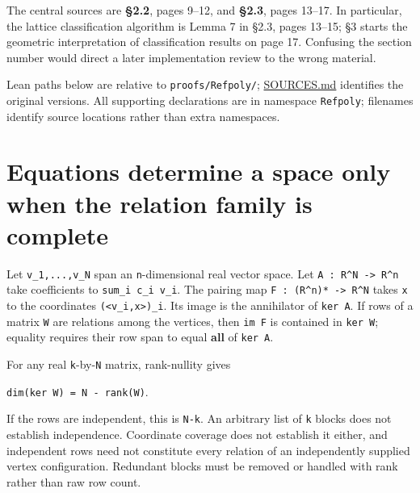 \documentclass[11pt,a4paper,oneside]{report}
\begin{document}
The central sources are \textbf{§2.2}, pages 9--12, and \textbf{§2.3},
pages 13--17. In particular, the lattice classification algorithm is
Lemma 7 in §2.3, pages 13--15; §3 starts the geometric interpretation of
classification results on page 17. Confusing the section number would
direct a later implementation review to the wrong material.

Lean paths below are relative to \texttt{proofs/\allowbreak{}Refpoly/};
\href{../../proofs/SOURCES.md}{SOURCES.md} identifies the original
versions. All supporting declarations are in namespace \texttt{Refpoly};
filenames identify source locations rather than extra namespaces.

\section{Equations determine a space only when the relation family is
complete}\label{cws-and-lattice-realizations--equations-determine-a-space-only-when-the-relation-family-is-complete}

Let
\texttt{v\_\allowbreak{}1,\allowbreak{}.\allowbreak{}.\allowbreak{}.\allowbreak{},\allowbreak{}v\_\allowbreak{}N}
span an \texttt{n}-dimensional real vector space. Let
\texttt{A :\allowbreak{} R\textasciicircum{}N -\allowbreak{}> R\textasciicircum{}n}
take coefficients to
\texttt{sum\_\allowbreak{}i c\_\allowbreak{}i v\_\allowbreak{}i}. The
pairing map
\texttt{F :\allowbreak{} (\allowbreak{}R\textasciicircum{}n)\allowbreak{}* -\allowbreak{}> R\textasciicircum{}N}
takes \texttt{x} to the coordinates
\texttt{(\allowbreak{}<v\_\allowbreak{}i,\allowbreak{}x>)\allowbreak{}\_\allowbreak{}i}.
Its image is the annihilator of \texttt{ker A}. If rows of a matrix
\texttt{W} are relations among the vertices, then \texttt{im F} is
contained in \texttt{ker W}; equality requires their row span to equal
\textbf{all} of \texttt{ker A}.

For any real \texttt{k}-by-\texttt{N} matrix, rank-nullity gives

\texttt{dim(\allowbreak{}ker W)\allowbreak{} =\allowbreak{} N -\allowbreak{} rank(\allowbreak{}W)}.

If the rows are independent, this is \texttt{N-\allowbreak{}k}. An
arbitrary list of \texttt{k} blocks does not establish independence.
Coordinate coverage does not establish it either, and independent rows
need not constitute every relation of an independently supplied vertex
configuration. Redundant blocks must be removed or handled with rank
rather than raw row count.
\end{document}
